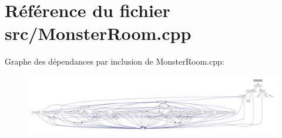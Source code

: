 \section{Référence du fichier src/\-Monster\-Room.cpp}
\label{_monster_room_8cpp}
Graphe des dépendances par inclusion de Monster\-Room.\-cpp\-:\nopagebreak
\begin{figure}[H]
\begin{center}
\leavevmode
\includegraphics[width=350pt]{_monster_room_8cpp__incl}
\end{center}
\end{figure}
